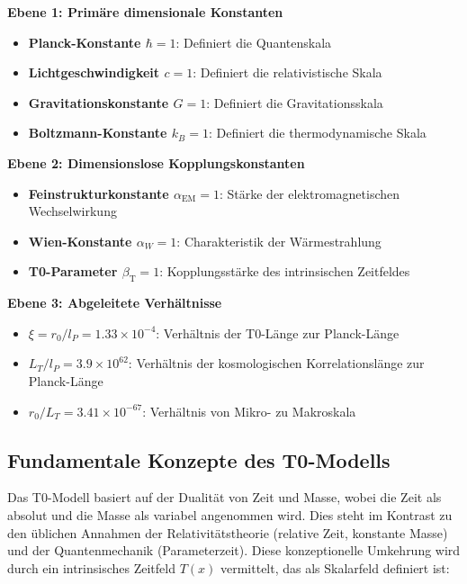 \documentclass[12pt,a4paper]{article}
\newcommand{\Tfield}{T(x)}
\newcommand{\alphaEM}{\alpha_{\text{EM}}}
\newcommand{\betaT}{\beta_{\text{T}}}
\begin{document}
	\begin{tcolorbox}[colback=blue!5!white,colframe=blue!75!black,title=Hierarchische Ebenen der Konstanten]
		\textbf{Ebene 1: Primäre dimensionale Konstanten}
		\begin{itemize}
			\item \textbf{Planck-Konstante $\hbar = 1$}: Definiert die Quantenskala
			\item \textbf{Lichtgeschwindigkeit $c = 1$}: Definiert die relativistische Skala
			\item \textbf{Gravitationskonstante $G = 1$}: Definiert die Gravitationsskala
			\item \textbf{Boltzmann-Konstante $k_B = 1$}: Definiert die thermodynamische Skala
		\end{itemize}
		
		\textbf{Ebene 2: Dimensionslose Kopplungskonstanten}
		\begin{itemize}
			\item \textbf{Feinstrukturkonstante $\alphaEM = 1$}: Stärke der elektromagnetischen Wechselwirkung
			\item \textbf{Wien-Konstante $\alpha_W = 1$}: Charakteristik der Wärmestrahlung
			\item \textbf{T0-Parameter $\betaT = 1$}: Kopplungsstärke des intrinsischen Zeitfeldes
		\end{itemize}
		
		\textbf{Ebene 3: Abgeleitete Verhältnisse}
		\begin{itemize}
			\item \textbf{$\xi = r_0/l_P = 1.33 \times 10^{-4}$}: Verhältnis der T0-Länge zur Planck-Länge
			\item \textbf{$L_T/l_P = 3.9 \times 10^{62}$}: Verhältnis der kosmologischen Korrelationslänge zur Planck-Länge
			\item \textbf{$r_0/L_T = 3.41 \times 10^{-67}$}: Verhältnis von Mikro- zu Makroskala
		\end{itemize}
	\end{tcolorbox}
	
	\subsection{Fundamentale Konzepte des T0-Modells}
	
	Das T0-Modell basiert auf der Dualität von Zeit und Masse, wobei die Zeit als absolut und die Masse als variabel angenommen wird. Dies steht im Kontrast zu den üblichen Annahmen der Relativitätstheorie (relative Zeit, konstante Masse) und der Quantenmechanik (Parameterzeit). Diese konzeptionelle Umkehrung wird durch ein intrinsisches Zeitfeld $\Tfield$ vermittelt, das als Skalarfeld definiert ist:
	
\end{document}
